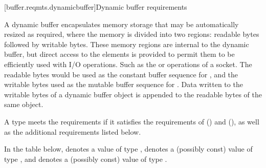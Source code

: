 [buffer.reqmts.dynamicbuffer]{Dynamic buffer requirements}

\pnum
A dynamic buffer encapsulates memory storage that may be automatically resized as required, where the memory is divided into two regions: readable bytes followed by writable bytes. These memory regions are internal to the dynamic buffer, but direct access to the elements is provided to permit them to be efficiently used with I/O operations. \enternote Such as the  or  operations of a socket. The readable bytes would be used as the constant buffer sequence for , and the writable bytes used as the mutable buffer sequence for . \exitnote Data written to the writable bytes of a dynamic buffer object is appended to the readable bytes of the same object.

\pnum
A type  meets the  requirements if it satisfies the requirements of  () and  (), as well as the additional requirements listed below.

\pnum
In the table below,  denotes a value of type ,  denotes a (possibly const) value of type , and  denotes a (possibly const) value of type .

